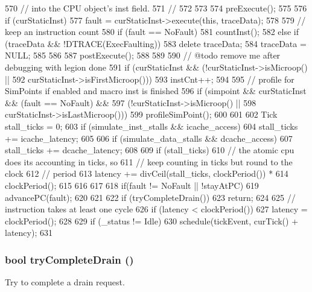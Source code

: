 \begin{DoxyCode}
{{{{{570                     // into the CPU object's inst field.
571                 //}
572             }
573 
574             preExecute();
575 
576             if (curStaticInst) {
577                 fault = curStaticInst->execute(this, traceData);
578 
579                 // keep an instruction count
580                 if (fault == NoFault)
581                     countInst();
582                 else if (traceData && !DTRACE(ExecFaulting)) {
583                     delete traceData;
584                     traceData = NULL;
585                 }
586 
587                 postExecute();
588             }
589 
590             // @todo remove me after debugging with legion done
591             if (curStaticInst && (!curStaticInst->isMicroop() ||
592                         curStaticInst->isFirstMicroop()))
593                 instCnt++;
594 
595             // profile for SimPoints if enabled and macro inst is finished
596             if (simpoint && curStaticInst && (fault == NoFault) &&
597                     (!curStaticInst->isMicroop() ||
598                      curStaticInst->isLastMicroop())) {
599                 profileSimPoint();
600             }
601 
602             Tick stall_ticks = 0;
603             if (simulate_inst_stalls && icache_access)
604                 stall_ticks += icache_latency;
605 
606             if (simulate_data_stalls && dcache_access)
607                 stall_ticks += dcache_latency;
608 
609             if (stall_ticks) {
610                 // the atomic cpu does its accounting in ticks, so
611                 // keep counting in ticks but round to the clock
612                 // period
613                 latency += divCeil(stall_ticks, clockPeriod()) *
614                     clockPeriod();
615             }
616 
617         }
618         if(fault != NoFault || !stayAtPC)
619             advancePC(fault);
620     }
621 
622     if (tryCompleteDrain())
623         return;
624 
625     // instruction takes at least one cycle
626     if (latency < clockPeriod())
627         latency = clockPeriod();
628 
629     if (_status != Idle)
630         schedule(tickEvent, curTick() + latency);
631 }
\end{DoxyCode}
\hypertarget{classAtomicSimpleCPU_abfea8f75a7a7480716801affeebbe87b}{
\subsubsection[{tryCompleteDrain}]{\setlength{\rightskip}{0pt plus 5cm}bool tryCompleteDrain ()}}
\label{classAtomicSimpleCPU_abfea8f75a7a7480716801affeebbe87b}
Try to complete a drain request.

